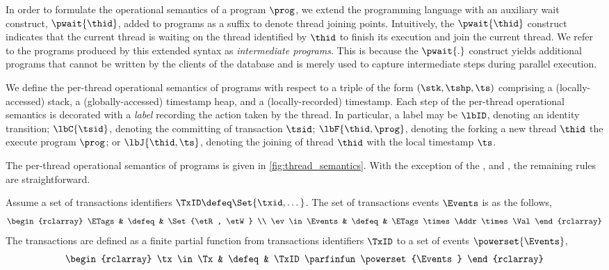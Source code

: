 In order to formulate the operational semantics of a program $\prog$, we extend the programming language with an auxiliary wait construct, \(\pwait{\thid} \), added to programs as a suffix to denote thread joining points.
Intuitively, the \( \pwait{\thid} \) construct indicates that the current thread is waiting on the thread identified by \( \thid \) to finish its execution and join the current thread. We refer to the programs produced by this extended syntax as \emph{intermediate programs}. This is because the $\pwait{.}$ construct yields additional programs that cannot be written by the clients of the database and is merely used to capture intermediate steps during parallel execution. 
%

We define the per-thread operational semantics of programs with respect to a triple of the form $(\stk, \tshp, \ts)$ comprising a (locally-accessed) stack, a (globally-accessed) timestamp heap, and a (locally-recorded) timestamp. 
Each step of the per-thread operational semantics is decorated with a \emph{label} recording the action taken by the thread. In particular, a label may be $\lbID$, denoting an identity transition; $\lbC{\tsid}$, denoting the committing of transaction $\tsid$; $\lbF{\thid, \prog}$, denoting the forking a new thread $\thid$ the execute program $\prog$; or $\lbJ{\thid, \ts}$, denoting the joining of thread $\thid$ with the local timestamp $\ts$.
  
The per-thread operational semantics of programs is given in \fig\ref{fig:thread_semantics}.
With the exception of the ,  and , the remaining rules are straightforward.


\begin{defn}[transactions]
Assume a set of transactions identifiers \( \TxID \defeq \Set{\txid, \dots}\).
The set of transactions events \( \Events \) is as the follows,
\[
\begin{rclarray}
\ETags & \defeq & \Set{\etR, \etW} \\
\ev \in \Events & \defeq  & \ETags \times \Addr \times \Val
\end{rclarray}
\]
The transactions are defined as a finite partial function from transactions identifiers \( \TxID \) to a set of events \( \powerset{\Events} \),
\[
\begin{rclarray}
\tx \in \Tx & \defeq & \TxID \parfinfun \powerset{\Events}
\end{rclarray}
\]
\end{defn}


